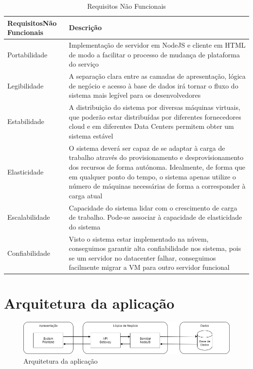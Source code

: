 \documentclass[11pt,a4paper]{article}
\begin{document}
\begin{table}[H]
	\begin{center}
		\begin{tabular}{|p{3.5cm}|p{9.5cm}|}
		\hline
			\textbf{Requisitos\newline Não Funcionais} & \textbf{Descrição}\\ \hline
			Portabilidade & Implementação de servidor em NodeJS e cliente em HTML de modo a facilitar o processo de mudança de plataforma do serviço \\ \hline
			Legibilidade & A separação clara entre as camadas de apresentação, lógica de negócio e acesso à base de dados irá tornar o fluxo do sistema mais legível para os desenvolvedores \\ \hline
			Estabilidade & A distribuição do sistema por diversas máquinas virtuais, que poderão estar distribuídas por diferentes fornecedores cloud e em diferentes Data Centers permitem obter um sistema estável \\ \hline
			Elasticidade & O sistema deverá ser capaz de se adaptar à carga de trabalho através do provisionamento e desprovisionamento dos recursos de forma autónoma. Idealmente, de forma que em qualquer ponto do tempo, o sistema apenas utilize o número de máquinas necessárias de forma a corresponder à carga atual \\ \hline
			Escalabilidade & Capacidade do sistema lidar com o crescimento de carga de trabalho. Pode-se associar à capacidade de elasticidade do sistema \\ \hline
			Confiabilidade & Visto o sistema estar implementado na núvem, conseguimos garantir alta confiabilidade nos sistema, pois se um servidor no datacenter falhar, conseguimos facilmente migrar a VM para outro servidor funcional \\ \hline
	\end{tabular}
	\label{tab1}
	\end{center}
	\caption{Requisitos Não Funcionais}
\end{table}
\paragraph{}

\section{Arquitetura da aplicação}
\begin{figure}[H]
  \centering
  \includegraphics[scale=0.4]{App_arc.png}
  \caption{Arquitetura da aplicação}
\end{figure}
\end{document}
